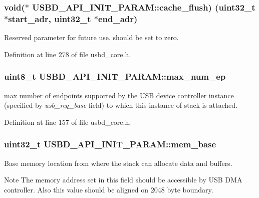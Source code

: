 \subsubsection[{\texorpdfstring{cache\+\_\+flush}{cache_flush}}]{\setlength{\rightskip}{0pt plus 5cm}void($\ast$  U\+S\+B\+D\+\_\+\+A\+P\+I\+\_\+\+I\+N\+I\+T\+\_\+\+P\+A\+R\+A\+M\+::cache\+\_\+flush) (uint32\+\_\+t $\ast$start\+\_\+adr, uint32\+\_\+t $\ast$end\+\_\+adr)}\hypertarget{structUSBD__API__INIT__PARAM_a7cba1a0917ee4ef1d8288db18f907bd4}{}\label{structUSBD__API__INIT__PARAM_a7cba1a0917ee4ef1d8288db18f907bd4}
Reserved parameter for future use. should be set to zero. 

Definition at line 278 of file usbd\+\_\+core.\+h.

\subsubsection[{\texorpdfstring{max\+\_\+num\+\_\+ep}{max_num_ep}}]{\setlength{\rightskip}{0pt plus 5cm}uint8\+\_\+t U\+S\+B\+D\+\_\+\+A\+P\+I\+\_\+\+I\+N\+I\+T\+\_\+\+P\+A\+R\+A\+M\+::max\+\_\+num\+\_\+ep}\hypertarget{structUSBD__API__INIT__PARAM_a168996cbd91b47939fe823bf0bf7cbe0}{}\label{structUSBD__API__INIT__PARAM_a168996cbd91b47939fe823bf0bf7cbe0}
max number of endpoints supported by the U\+SB device controller instance (specified by {\itshape usb\+\_\+reg\+\_\+base} field) to which this instance of stack is attached. 

Definition at line 157 of file usbd\+\_\+core.\+h.

\subsubsection[{\texorpdfstring{mem\+\_\+base}{mem_base}}]{\setlength{\rightskip}{0pt plus 5cm}uint32\+\_\+t U\+S\+B\+D\+\_\+\+A\+P\+I\+\_\+\+I\+N\+I\+T\+\_\+\+P\+A\+R\+A\+M\+::mem\+\_\+base}\hypertarget{structUSBD__API__INIT__PARAM_ac3209246722c2395c476c82d0e76c879}{}\label{structUSBD__API__INIT__PARAM_ac3209246722c2395c476c82d0e76c879}
Base memory location from where the stack can allocate data and buffers. \begin{DoxyNote}{Note}
The memory address set in this field should be accessible by U\+SB D\+MA controller. Also this value should be aligned on 2048 byte boundary. 
\end{DoxyNote}


